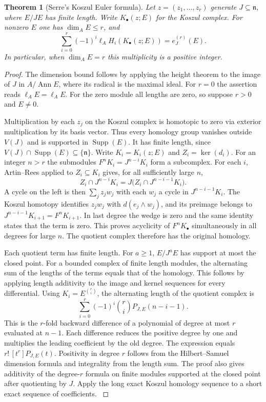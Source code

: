 \documentclass[11pt,oneside,openany]{book}
\newtheorem{theorem}{Theorem}[chapter]
\theoremstyle{definition}
\theoremstyle{remark}
\begin{document}
\begin{theorem}[Serre's Koszul Euler formula]\label{res:I05}
Let \(z=(z_1,\ldots,z_r)\) generate \(J\subseteq\mathfrak n\), where
\(E/JE\) has finite length. Write \(K_\bullet(z;E)\) for the Koszul
complex. For nonzero \(E\) one has \(\dim_A E\le r\), and
\[
 \sum_{i=0}^r(-1)^i\ell_A H_i(K_\bullet(z;E))=e^{(r)}_J(E).
\]
In particular, when \(\dim_A E=r\) this multiplicity is a positive
integer.
\end{theorem}
\begin{proof}
The dimension bound follows by applying the height theorem to the
image of \(J\) in \(A/\operatorname{Ann} E\), where its radical is
the maximal ideal.
\cite[ALG-05-C03-R01 and ALG-05-C03-S01]{p103}
For \(r=0\) the assertion reads \(\ell_A E=\ell_A E\). For the zero
module all lengths are zero, so suppose \(r>0\) and \(E\ne 0\).

Multiplication by each \(z_j\) on the Koszul complex is homotopic to
zero via exterior multiplication by its basis vector. Thus every
homology group vanishes outside \(V(J)\) and is supported in
\(\operatorname{Supp}(E)\). It has finite length, since
\(V(J)\cap\operatorname{Supp}(E)\subseteq\{\mathfrak n\}\).
Write \(K_i=K_i(z;E)\) and \(Z_i=\ker(d_i)\). For an integer \(n>r\)
the submodules \(F^nK_i=J^{n-i}K_i\) form a subcomplex. For each \(i\),
Artin--Rees applied to \(Z_i\subseteq K_i\) gives, for all sufficiently
large \(n\),
\[
 Z_i\cap J^{n-i}K_i
     =J\bigl(Z_i\cap J^{n-i-1}K_i\bigr).
\]
A cycle on the left is then \(\sum_j z_j w_j\) with each \(w_j\)
a cycle in \(J^{n-i-1}K_i\). The Koszul homotopy identifies \(z_jw_j\)
with \(d(e_j\wedge w_j)\), and its preimage belongs to
\(J^{n-i-1}K_{i+1}=F^nK_{i+1}\). In last degree the wedge is zero
and the same identity states that the term is zero. This proves
acyclicity of \(F^nK_\bullet\) simultaneously in all degrees for
large \(n\). The quotient complex therefore has the original
homology.

Each quotient term has finite length. For \(a\ge 1\),
\(E/J^aE\) has support at most the closed point. For a bounded complex
of finite length modules, the alternating sum of the lengths of
the terms equals that of the homology. This follows by applying
length additivity to the image and kernel sequences for every
differential. Using \(K_i=E^{\binom ri}\), the alternating length
of the quotient complex is
\[
 \sum_{i=0}^r(-1)^i\binom ri P_{J,E}(n-i-1).
\]
This is the \(r\)-fold backward difference of a polynomial of degree
at most \(r\) evaluated at \(n-1\). Each difference reduces the
positive degree by one and multiplies the leading coefficient by
the old degree. The expression equals \(r!\,[t^r]P_{J,E}(t)\).
Positivity in degree \(r\) follows from the Hilbert--Samuel dimension
formula and integrality from the length sum. The proof also gives
additivity of the degree-\(r\) formula on finite modules supported
at the closed point after quotienting by \(J\). Apply the long exact
Koszul homology sequence to a short exact sequence of coefficients.
\cite[Chapter IV, \S A.3]{serre-local}
\end{proof}
\end{document}
